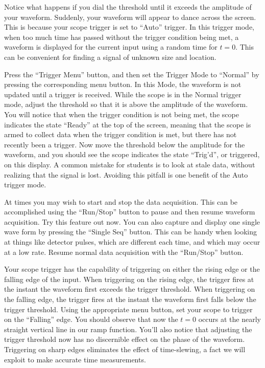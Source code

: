 Notice what happens if you dial the threshold until it exceeds the
amplitude of your waveform.  Suddenly, your waveform will appear to
dance across the screen.  This is because your scope trigger is set to
``Auto'' trigger.  In this trigger mode, when too much time has passed
without the trigger condition being met, a waveform is displayed for
the current input using a random time for $t=0$.  This can be
convenient for finding a signal of unknown size and location.

Press the ``Trigger Menu'' button, and then set the Trigger Mode to
``Normal'' by pressing the corresponding menu button.  In this Mode,
the waveform is not updated until a trigger is received.  While the
scope is in the Normal trigger mode, adjust the threshold so that it
is above the amplitude of the waveform.  You will notice that when the
trigger condition is not being met, the scope indicates the state
``Ready'' at the top of the screen, meaning that the scope is armed to
collect data when the trigger condition is met, but there has not
recently been a trigger.  Now move the threshold below the amplitude
for the waveform, and you should see the scope indicates the state
``Trig'd'', or triggered, on this display.  A common mistake for
students is to look at stale data, without realizing that the signal
is lost.  Avoiding this pitfall is one benefit of the Auto trigger
mode.

At times you may wish to start and stop the data acquisition.  This
can be accomplished using the ``Run/Stop'' button to pause and then
resume waveform acquisition.  Try this feature out now.  You can also
capture and display one single wave form by pressing the ``Single
Seq'' button.  This can be handy when looking at things like detector
pulses, which are different each time, and which may occur at a low
rate.  Resume normal data acquisition with the ``Run/Stop'' button.

Your scope trigger has the capability of triggering on either the
rising edge or the falling edge of the input.  When triggering on the
rising edge, the trigger fires at the instant the waveform first
exceeds the trigger threshold.  When triggering on the falling edge,
the trigger fires at the instant the waveform first falls below the
trigger threshold.  Using the appropriate menu button, set your scope
to trigger on the ``Falling'' edge.  You should observe that now the
$t=0$ occurs at the nearly straight vertical line in our ramp
function.  You'll also notice that adjusting the trigger threshold now
has no discernible effect on the phase of the waveform.  Triggering on
sharp edges eliminates the effect of time-slewing, a fact we will
exploit to make accurate time measurements.

